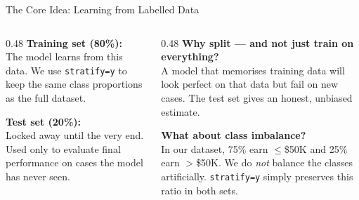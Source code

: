 \documentclass[aspectratio=169, 10pt]{beamer}
\begin{document}
\begin{frame}{The Core Idea: Learning from Labelled Data}

\begin{center}
\end{center}

\vspace{0.6em}
\begin{columns}[T]
\begin{column}{0.48\textwidth}
\textbf{Training set (80\%):}\\
The model learns from this data. We use \texttt{stratify=y} to keep the same class proportions as the full dataset.

\vspace{0.5em}
\textbf{Test set (20\%):}\\
Locked away until the very end. Used only to evaluate final performance on cases the model has never seen.
\end{column}
\begin{column}{0.48\textwidth}
\textbf{Why split — and not just train on everything?}\\
A model that memorises training data will look perfect on that data but fail on new cases. The test set gives an honest, unbiased estimate.

\vspace{0.5em}
\textbf{What about class imbalance?}\\
In our dataset, 75\% earn $\leq$\$50K and 25\% earn $>$\$50K. We do \textit{not} balance the classes artificially. \texttt{stratify=y} simply preserves this ratio in both sets.
\end{column}
\end{columns}
\end{frame}
\end{document}
